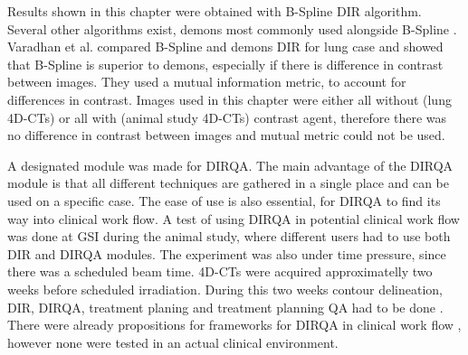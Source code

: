 \documentclass[type=dr, dr=rernat, accentcolor=tud7b,colorbacktitle, bigchapter, openright, twoside, 12pt ]{tudthesis}
\begin{document}
Results shown in this chapter were obtained with B-Spline DIR algorithm. Several other algorithms exist, demons most commonly used alongside B-Spline \cite{Thirion1998}. Varadhan et al. compared B-Spline and demons DIR
for lung case \cite{Varadhan2013} and showed that B-Spline is superior to demons, especially if there is difference in contrast between images. They used a mutual information
metric, to account for differences in contrast. Images used in this chapter were either all without (lung 4D-CTs) or all with (animal study 4D-CTs) contrast agent, therefore there was no difference in contrast
between images and mutual metric could not be used.

A designated module was made for DIRQA. The main advantage of the DIRQA module is that all different techniques are gathered in a single place and can be used on a specific case. 
The ease of use is also essential, for DIRQA to find its way into clinical work flow.
A test of using DIRQA in potential clinical work flow was done at GSI during the animal study, where different users had to use both DIR and DIRQA modules. The experiment was also under time pressure, since there was
a scheduled beam time. 4D-CTs were acquired approximatelly two weeks before scheduled irradiation. During this two weeks contour delineation, DIR, DIRQA, treatment planing 
and treatment planning QA had to be done \cite{Lehmann2015}.
There were already propositions for frameworks for DIRQA in clinical work flow \cite{Varadhan2013}, however none were tested in an actual clinical environment.
\end{document}
